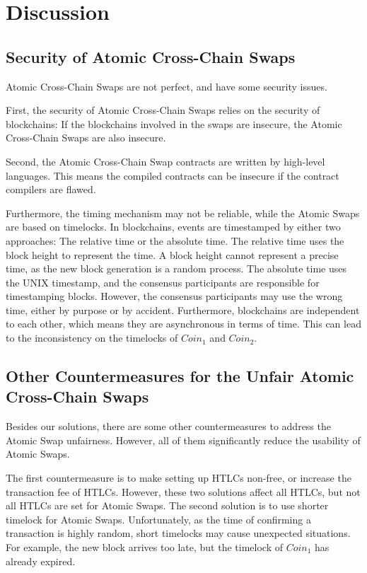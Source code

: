 \section{Discussion}
\label{sec:discussion}

\subsection{Security of Atomic Cross-Chain Swaps}

Atomic Cross-Chain Swaps are not perfect, and have some security issues.

First, the security of Atomic Cross-Chain Swaps relies on the security of blockchains:
If the blockchains involved in the swaps are insecure, the Atomic Cross-Chain Swaps are also insecure.

Second, the Atomic Cross-Chain Swap contracts are written by high-level languages.
This means the compiled contracts can be insecure if the contract compilers are flawed.

Furthermore, the timing mechanism may not be reliable, while the Atomic Swaps are based on timelocks.
In blockchains, events are timestamped by either two approaches: The relative time or the absolute time.
The relative time uses the block height to represent the time.
A block height cannot represent a precise time, as the new block generation is a random process.
The absolute time uses the UNIX timestamp, and the consensus participants are responsible for timestamping blocks.
However, the consensus participants may use the wrong time, either by purpose or by accident.
Furthermore, blockchains are independent to each other, which means they are asynchronous in terms of time.
This can lead to the inconsistency on the timelocks of $Coin_1$ and $Coin_2$.


\subsection{Other Countermeasures for the Unfair Atomic Cross-Chain Swaps}

Besides our solutions, there are some other countermeasures to address the Atomic Swap unfairness.
However, all of them significantly reduce the usability of Atomic Swaps.

The first countermeasure is to make setting up HTLCs non-free, or increase the transaction fee of HTLCs.
However, these two solutions affect all HTLCs, but not all HTLCs are set for Atomic Swaps.
The second solution is to use shorter timelock for Atomic Swaps.
Unfortunately, as the time of confirming a transaction is highly random,
short timelocks may cause unexpected situations.
For example, the new block arrives too late, but the timelock of $Coin_1$ has already expired.

